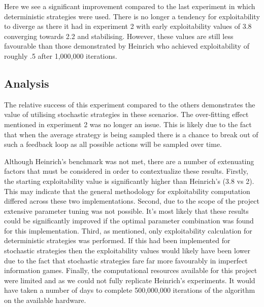 Here we see a significant improvement compared to the last experiment in which deterministic strategies were used.
There is no longer a tendency for exploitability to diverge as there it had in experiment 2 with
early exploitability values of 3.8 converging towards 2.2 and stabilising.
However, these values are still less favourable than those demonstrated by Heinrich who achieved
exploitability of roughly .5 after 1,000,000 iterations.

\subsection{Analysis}\label{subsec:analysis3}
The relative success of this experiment compared to the others demonstrates the value of
utilising stochastic strategies in these scenarios.
The over-fitting effect mentioned in experiment 2 was no longer an issue.
This is likely due to the fact that when the average strategy is being sampled there is a
chance to break out of such a feedback loop as all possible actions will be sampled over time.

Although Heinrich's benchmark was not met, there are a number of extenuating factors that must be
considered in order to contextualize these results.
Firstly, the starting exploitability value is significantly higher than Heinrich's (3.8 vs 2).
This may indicate that the general methodology for exploitability computation differed across these
two implementations.
Second, due to the scope of the project extensive parameter tuning was not possible.
It's most likely that these results could be significantly improved if the optimal parameter
combination was found for this implementation.
Third, as mentioned, only exploitability calculation for deterministic strategies was performed.
If this had been implemented for stochastic strategies then the exploitability values would
likely have been lower due to the fact that stochastic strategies fare far more favourably in
imperfect information games\citep{heinrich2016deep}.
Finally, the computational resources available for this project were limited and as we could not
fully replicate Heinrich's experiments.
It would have taken a number of days to complete 500,000,000 iterations of the algorithm on the
available hardware.